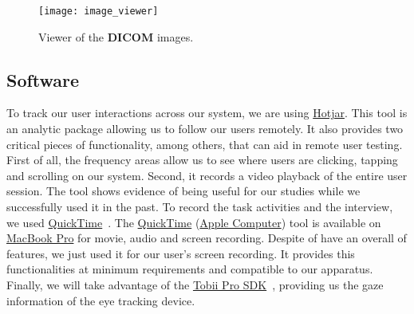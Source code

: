 
\hfill

\begin{figure}[h]
\centering
\texttt{[image: image\_viewer]}
\caption{Viewer of the \textbf{DICOM} images.}
\label{fig:image_viewer}
\end{figure}

\hfill


\subsection{Software}

To track our user interactions across our system, we are using \hyperlink{https://www.hotjar.com/}{Hotjar}. This tool is an analytic package allowing us to follow our users remotely. It also provides two critical pieces of functionality, among others, that can aid in remote user testing. First of all, the frequency areas allow us to see where users are clicking, tapping and scrolling on our system. Second, it records a video playback of the entire user session. The tool shows evidence of being useful for our studies while we successfully used it in the past. To record the task activities and the interview, we used \hyperlink{https://support.apple.com/downloads/quicktime}{QuickTime}~\cite{rowell2006internet}. The \hyperlink{https://support.apple.com/downloads/quicktime}{QuickTime} (\hyperlink{https://www.apple.com/}{Apple Computer}) tool is available on \hyperlink{https://www.apple.com/shop/buy-mac/macbook-pro}{MacBook Pro} for movie, audio and screen recording. Despite of have an overall of features, we just used it for our user's screen recording. It provides this functionalities at minimum requirements and compatible to our apparatus. Finally, we will take advantage of the \hyperlink{https://www.tobiipro.com/product-listing/tobii-pro-sdk/}{Tobii Pro SDK}~\cite{chatelain2018evaluation}, providing us the gaze information of the eye tracking device.

\clearpage